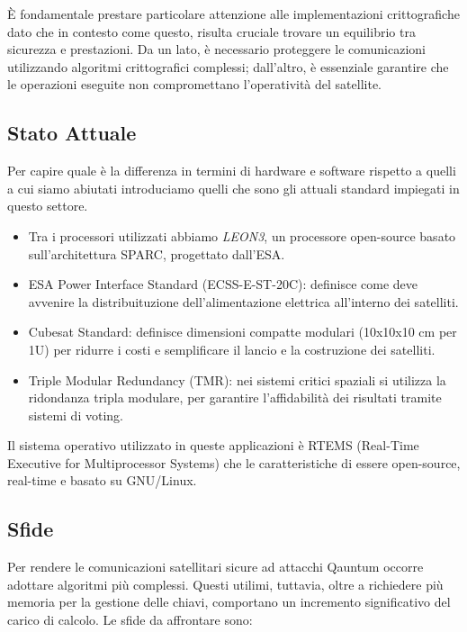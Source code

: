 \noindent
È fondamentale prestare particolare attenzione alle implementazioni 
crittogra\-fiche dato che in contesto come questo, risulta cruciale trovare un equilibrio tra
sicurezza e prestazioni. Da un lato, è necessario proteggere le comunicazioni
utilizzando algoritmi crittografici complessi; dall'altro, è essenziale
garantire che le operazioni eseguite non compromettano l'operatività del
satellite.

\subsection{Stato Attuale}

Per capire quale è la differenza in termini di hardware e software rispetto a quelli a cui siamo abiutati 
introduciamo quelli che sono gli attuali standard impiegati in questo settore.

\begin{itemize}
    \item Tra i processori utilizzati abbiamo \textit{LEON3}, un processore open-source basato sull'architettura SPARC, progettato dall'ESA. 
    \item ESA Power Interface Standard (ECSS-E-ST-20C): definisce come deve avvenire la distribuituzione dell'alimentazione elettrica all'interno dei satelliti.
    \item Cubesat Standard: definisce dimensioni compatte modulari (10x10x10 cm per 1U) per ridurre i costi e semplificare il lancio e la costruzione dei satelliti.
    \item Triple Modular Redundancy (TMR): nei sistemi critici spaziali si utilizza la ridondanza tripla modulare, per garantire l'affidabilità dei risultati tramite sistemi di voting.
\end{itemize}
\noindent
Il sistema operativo utilizzato in queste applicazioni è RTEMS (Real-Time Executive for Multiprocessor Systems) che le caratteristiche di essere open-source, real-time e basato su GNU/Linux.

\subsection{Sfide}
\noindent
Per rendere le comunicazioni satellitari sicure ad attacchi Qauntum occorre adottare algoritmi più complessi.
Questi utilimi, tuttavia, oltre a richiedere più memoria per la gestione delle chiavi,
comportano un incremento significativo del carico di calcolo. Le sfide da affrontare sono:

